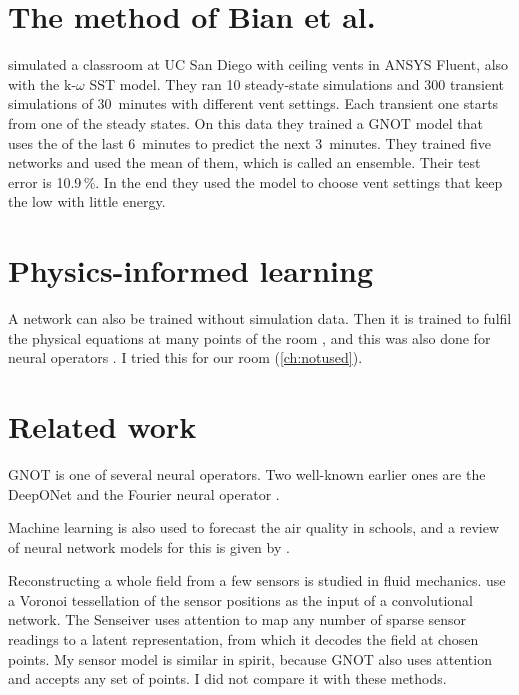 \section{The method of Bian et al.}
\citet{bian2025} simulated a classroom at UC San Diego with ceiling vents in ANSYS Fluent, also with the
k-$\omega$ SST model. They ran 10 steady-state simulations and 300 transient simulations of 30~minutes with different vent settings.
Each transient one starts from one of the steady states. On this data they trained a GNOT model that uses the \cotwo{} of the
last 6~minutes to predict the next 3~minutes. They trained five networks and used the mean of them, which is
called an ensemble. Their test error is 10.9\,\%. In the end they used the model to choose vent settings that
keep the \cotwo{} low with little energy.

\section{Physics-informed learning}
A network can also be trained without simulation data. Then it is trained to fulfil the physical equations
at many points of the room \citep{raissi2019}, and this was also done for neural operators
\citep{li2021pino}. I tried this for our room (\cref{ch:notused}).

\section{Related work}
GNOT is one of several neural operators. Two well-known earlier ones are the DeepONet \citep{lu2021deeponet}
and the Fourier neural operator \citep{li2021fno}.

Machine learning is also used to forecast the air quality in schools, and a review of neural network models for
this is given by \citet{dong2023}.

Reconstructing a whole field from a few sensors is studied in fluid mechanics. \citet{fukami2021} use a Voronoi
tessellation of the sensor positions as the input of a convolutional network. The Senseiver \citep{santos2023}
uses attention to map any number of sparse sensor readings to a latent representation, from which it decodes the
field at chosen points. My sensor model is similar in spirit, because GNOT also uses attention and accepts any set
of points. I did not compare it with these methods.
